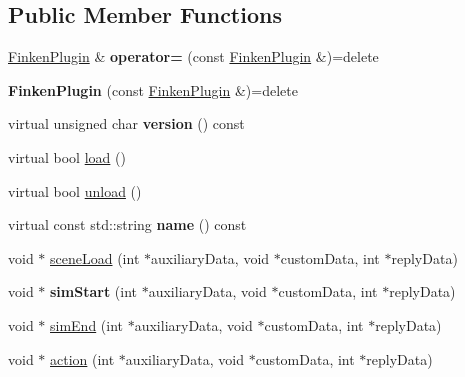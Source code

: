 \subsection*{Public Member Functions}
\begin{DoxyCompactItemize}
\item 
\hyperlink{classFinkenPlugin}{Finken\+Plugin} \& {\bfseries operator=} (const \hyperlink{classFinkenPlugin}{Finken\+Plugin} \&)=delete\hypertarget{classFinkenPlugin_a3ebea1e19535491b5db16c7f43df8e79}{}\label{classFinkenPlugin_a3ebea1e19535491b5db16c7f43df8e79}

\item 
{\bfseries Finken\+Plugin} (const \hyperlink{classFinkenPlugin}{Finken\+Plugin} \&)=delete\hypertarget{classFinkenPlugin_a5f4bc33c0d0bb05ca4f78090c7a2fda9}{}\label{classFinkenPlugin_a5f4bc33c0d0bb05ca4f78090c7a2fda9}

\item 
virtual unsigned char {\bfseries version} () const \hypertarget{classFinkenPlugin_a046a229dfbc8185bac916ad2e49ec865}{}\label{classFinkenPlugin_a046a229dfbc8185bac916ad2e49ec865}

\item 
virtual bool \hyperlink{classFinkenPlugin_afbe5d82635afe4b0c407de4724e8ee14}{load} ()
\item 
virtual bool \hyperlink{classFinkenPlugin_ae9c984b362c6a828206fa6201291851c}{unload} ()
\item 
virtual const std\+::string {\bfseries name} () const \hypertarget{classFinkenPlugin_a1a7d0d65f88654c37b282e07d36417ec}{}\label{classFinkenPlugin_a1a7d0d65f88654c37b282e07d36417ec}

\item 
void $\ast$ \hyperlink{classFinkenPlugin_a82c0cd5fa1b9fdb5f5a625458a9b545b}{scene\+Load} (int $\ast$auxiliary\+Data, void $\ast$custom\+Data, int $\ast$reply\+Data)
\item 
void $\ast$ {\bfseries sim\+Start} (int $\ast$auxiliary\+Data, void $\ast$custom\+Data, int $\ast$reply\+Data)\hypertarget{classFinkenPlugin_a142f62305fcc926bb6cf86744edbb82b}{}\label{classFinkenPlugin_a142f62305fcc926bb6cf86744edbb82b}

\item 
void $\ast$ \hyperlink{classFinkenPlugin_aec5f5cf14ca485055ccc321a716780a4}{sim\+End} (int $\ast$auxiliary\+Data, void $\ast$custom\+Data, int $\ast$reply\+Data)
\item 
void $\ast$ \hyperlink{classFinkenPlugin_a00d8bcdd7c4b28eb76712b84f512b12b}{action} (int $\ast$auxiliary\+Data, void $\ast$custom\+Data, int $\ast$reply\+Data)
\end{DoxyCompactItemize}
